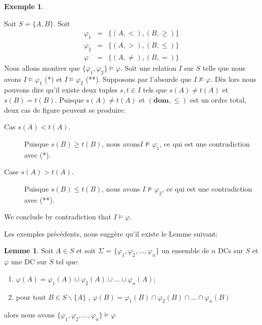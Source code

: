 \documentclass[letterpaper, 12pt]{report}
\theoremstyle{definition}
\newtheorem{mylemma}{Lemme}
\newtheorem{myexample}{Exemple}
\newcommand{\dom}{\mathbf{dom}}
\begin{document}
\begin{myexample}
\label{secondEx}

Soit $S=\{A,B\}$.
Soit
\begin{eqnarray*}
\varphi_{1} & = & \{(A,<), (B,\geq)\}\\
\varphi_{2} & = & \{(A,>), (B,\leq)\}\\
\varphi & = & \{(A,\neq), (B,=)\}
\end{eqnarray*}
Nous allons montrer que $\{\varphi_{1},\varphi_{2}\}\models\varphi$.
Soit une relation $I$ sur $S$ telle que nous avons $I\models\varphi_{1}$ (*) et $I\models\varphi_{2}$ (**).
Supposons par l'absurde que $I\not\models\varphi$.
Dès lors nous pouvons dire qu'il existe deux tuples $s,t\in I$ tels que
$s(A)\neq t(A)$ et $s(B)=t(B)$.
Puisque $s(A)\neq t(A)$ et $(\dom,\leq)$ est un ordre total,
deux cas de figure peuvent se produire:
\begin{description}
\item[Cas $s(A)<t(A)$.]
Puisque $s(B)\geq t(B)$, nous avons$I\not\models\varphi_{1}$, ce qui est une contradiction avec (*).
\item[Case $s(A)>t(A)$.]
Puisque $s(B)\leq t(B)$, nous avons $I\not\models\varphi_{2}$, ce qui est une contradiction avec (**).
\end{description}
We conclude by contradiction that  $I\models\varphi$.
\end{myexample}

Les exemples précédents, nous suggère qu'il existe le Lemme suivant:\\

\begin{mylemma}
\label{simpliLemme}
Soit $A \in S$ et soit $\Sigma$ = $\{\varphi_1 , \varphi_2,..., \varphi_n \}$ un ensemble de $n$ DCs sur $S$ et $\varphi$ une DC sur $S$ tel que:
\begin{enumerate}
\item $\varphi(A) = \varphi_1(A) \cup \varphi_2(A) \cup ... \cup \varphi_n(A)$;
\item pour tout $B \in S \backslash \{ A \}$ , $\varphi(B) = \varphi_1(B) \cap \varphi_2(B) \cap  ... \cap \varphi_n(B)$
\end{enumerate}

alors nous avons $\{ \varphi_1 , \varphi_2 ,...,\varphi_n \} \models \varphi$
\end{mylemma}
\end{document}
